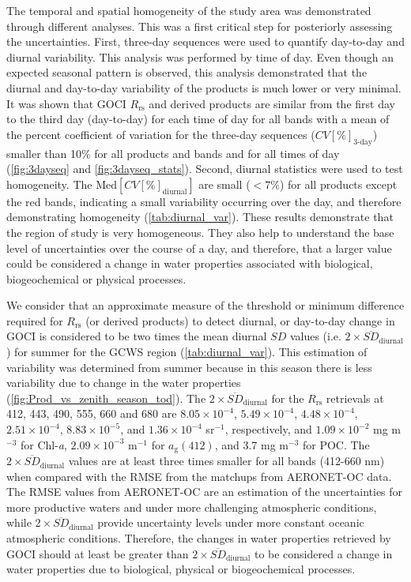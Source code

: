 \documentclass[remotesensing,article,submit,moreauthors,pdftex,10pt,a4paper]{Definitions/mdpi}
\begin{document}
The temporal and spatial homogeneity of the study area was demonstrated through different analyses. This was a first critical step for posteriorly assessing the uncertainties. First, three-day sequences were used to quantify day-to-day and diurnal variability. This analysis was performed by time of day. Even though an expected seasonal pattern is observed, this analysis demonstrated that the diurnal and day-to-day variability of the products is much lower or very minimal. It was shown that GOCI $R_\text{rs}$ and derived products are similar from the first day to the third day (day-to-day) for each time of day for all bands with a mean of the percent coefficient of variation for the three-day sequences ($CV[\%]_\text{3-day}$) smaller than 10\% for all products and bands and for all times of day (\autoref{fig:3dayseq} and \autoref{fig:3dayseq_stats}). Second, diurnal statistics were used to test homogeneity. The $\text{Med}[CV[\%]_\text{diurnal}]$ are small ($<7\%$) for all products except the red bands, indicating a small variability occurring over the day, and therefore demonstrating homogeneity (\autoref{tab:diurnal_var}). These results demonstrate that the region of study is very homogeneous. They also help to understand the base level of uncertainties over the course of a day, and therefore, that a larger value could be considered a change in water properties associated with biological, biogeochemical or physical processes.

We consider that an approximate measure of the threshold or minimum difference required for $R_\text{rs}$ (or derived products) to detect diurnal, or day-to-day change in GOCI is considered to be two times the mean diurnal $SD$ values (i.e. $2\times \overline{SD}_\text{diurnal}$) for summer for the GCWS region (\autoref{tab:diurnal_var}). This estimation of variability was determined from summer because in this season there is less variability due to change in the water properties (\autoref{fig:Prod_vs_zenith_season_tod}). The $2\times \overline{SD}_\text{diurnal}$ for the $R_\text{rs}$ retrievals at 412, 443, 490, 555, 660 and 680 are $8.05\times10^{-4}$, $5.49\times10^{-4}$, $4.48\times10^{-4}$, $2.51\times10^{-4}$, $8.83\times10^{-5}$, and $1.36\times10^{-4}$ sr$^{-1}$, respectively, and $1.09\times10^{-2}$  mg m$^{-3}$ for Chl-{\it a},  $2.09\times10^{-3}$ m$^{-1}$ for $a_\text{g}(412)$, and 3.7 mg m$^{-3}$ for POC. The $2\times \overline{SD}_\text{diurnal}$ values are at least three times smaller for all bands (412-660 nm) when compared with the RMSE from the matchups from AERONET-OC data. The RMSE values from AERONET-OC are an estimation of the uncertainties for more productive waters and under more challenging atmospheric conditions, while $2\times \overline{SD}_\text{diurnal}$ provide uncertainty levels under more constant oceanic atmospheric conditions.  Therefore, the changes in water properties retrieved by GOCI should at least be greater than $2\times \overline{SD}_\text{diurnal}$ to be considered a change in water properties due to biological, physical or biogeochemical processes.
\end{document}

